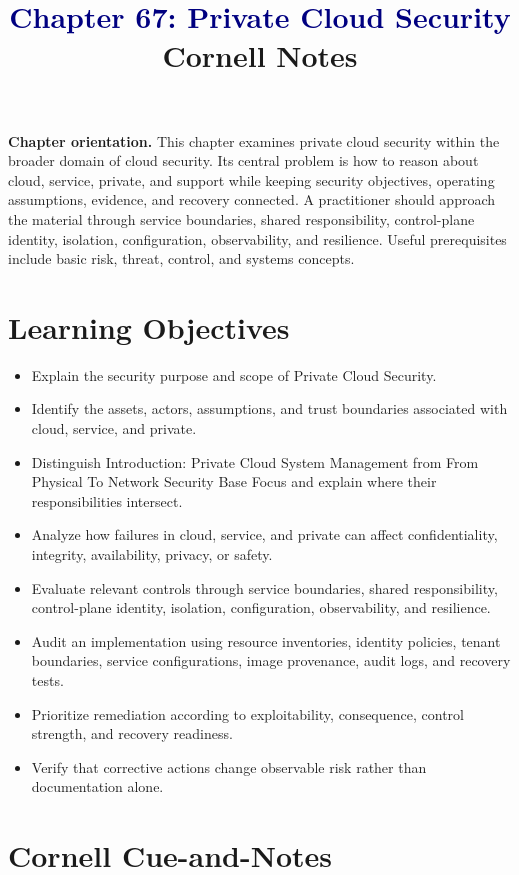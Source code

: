 \documentclass[11pt]{article}
\title{\textcolor{Navy}{Chapter 67: Private Cloud Security}\\[2mm]\large Cornell Notes}
\author{}
\date{}
\begin{document}
\maketitle
\thispagestyle{fancy}
\vspace{-1.5em}
\begin{orientationbox}
\textbf{Chapter orientation.} This chapter examines private cloud security within the broader domain of cloud security. Its central problem is how to reason about cloud, service, private, and support while keeping security objectives, operating assumptions, evidence, and recovery connected. A practitioner should approach the material through service boundaries, shared responsibility, control-plane identity, isolation, configuration, observability, and resilience. Useful prerequisites include basic risk, threat, control, and systems concepts.
\end{orientationbox}
\section*{Learning Objectives}
\begin{itemize}
\item Explain the security purpose and scope of Private Cloud Security.
\item Identify the assets, actors, assumptions, and trust boundaries associated with cloud, service, and private.
\item Distinguish Introduction: Private Cloud System Management from From Physical To Network Security Base Focus and explain where their responsibilities intersect.
\item Analyze how failures in cloud, service, and private can affect confidentiality, integrity, availability, privacy, or safety.
\item Evaluate relevant controls through service boundaries, shared responsibility, control-plane identity, isolation, configuration, observability, and resilience.
\item Audit an implementation using resource inventories, identity policies, tenant boundaries, service configurations, image provenance, audit logs, and recovery tests.
\item Prioritize remediation according to exploitability, consequence, control strength, and recovery readiness.
\item Verify that corrective actions change observable risk rather than documentation alone.
\end{itemize}
\section*{Cornell Cue-and-Notes}
\end{document}
